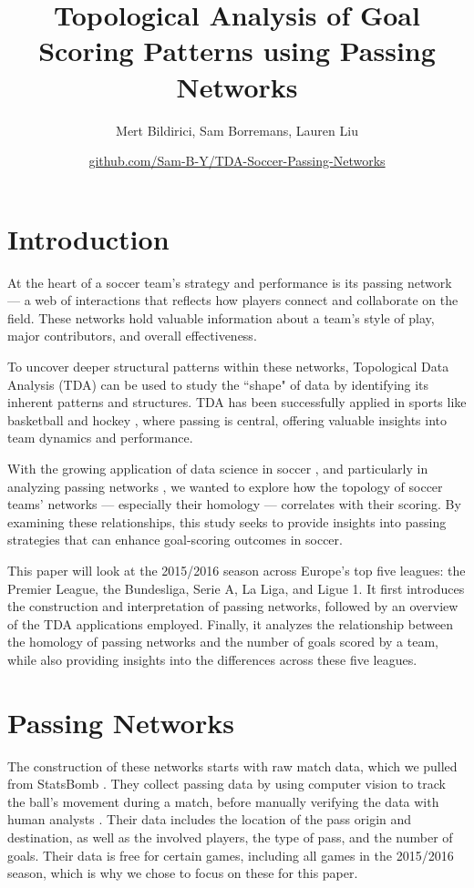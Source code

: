 \documentclass[10pt,twocolumn]{article}
\title{\textbf{Topological Analysis of Goal Scoring Patterns using Passing Networks}}
\author{Mert Bildirici, Sam Borremans, Lauren Liu}
\date{\href{https://github.com/Sam-B-Y/TDA-Soccer-Passing-Networks}{github.com/Sam-B-Y/TDA-Soccer-Passing-Networks}}
\begin{document}
\maketitle

\section*{Introduction}
At the heart of a soccer team's strategy and performance is its passing network — a web of interactions that reflects how players connect and collaborate on the field. These networks hold valuable information about a team's style of play, major contributors, and overall effectiveness. 

To uncover deeper structural patterns within these networks, Topological Data Analysis (TDA) can be used to study the ``shape" of data by identifying its inherent patterns and structures. TDA has been successfully applied in sports like basketball \cite{roehm-2021} and hockey \cite{goldfarb-2014}, where passing is central, offering valuable insights into team dynamics and performance. 

With the growing application of data science in soccer \cite{lolli-2024}, and particularly in analyzing passing networks \cite{buldu-2018}, we wanted to explore how the topology of soccer teams' networks — especially their homology — correlates with their scoring. By examining these relationships, this study seeks to provide insights into passing strategies that can enhance goal-scoring outcomes in soccer.

This paper will look at the 2015/2016 season across Europe's top five leagues: the Premier League, the Bundesliga, Serie A, La Liga, and Ligue 1. It first introduces the construction and interpretation of passing networks, followed by an overview of the TDA applications employed. Finally, it analyzes the relationship between the homology of passing networks and the number of goals scored by a team, while also providing insights into the differences across these five leagues.

\section*{Passing Networks}

The construction of these networks starts with raw match data, which we pulled from StatsBomb \cite{statsbomb-no-date}. They collect passing data by using computer vision to track the ball's movement during a match, before manually verifying the data with human analysts \cite{hudl-statsbomb-data-champions-2024}. Their data includes the location of the pass origin and destination, as well as the involved players, the type of pass, and the number of goals. Their data is free for certain games, including all games in the 2015/2016 season, which is why we chose to focus on these for this paper.
\end{document}
